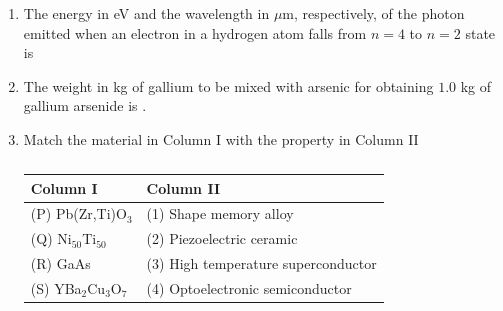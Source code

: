 \documentclass[a4paper,10pt]{article}
\begin{document}
\begin{enumerate}
    \item The energy in eV and the wavelength in $\mu$m, respectively, of the photon emitted when an electron in a hydrogen atom falls from $n = 4$ to $n = 2$ state is
    
    \hfill{}
    \begin{enumerate}
    \end{enumerate}
    
    \item The weight in kg of gallium  to be mixed with arsenic  for obtaining $1.0$ kg of gallium arsenide  is \underline{\hspace{2cm}}. 
    
    \hfill{}

    \item Match the material in Column I with the property in Column II
    \begin{table}[h!] \centering \caption*{} \label{tab:q19_material}
        \begin{tabular}{ll} \hline
            \textbf{Column I} & \textbf{Column II} \\ \hline
            (P) Pb(Zr,Ti)O$_3$ & (1) Shape memory alloy \\
            (Q) Ni$_{50}$Ti$_{50}$ & (2) Piezoelectric ceramic \\
            (R) GaAs & (3) High temperature superconductor \\
            (S) YBa$_2$Cu$_3$O$_7$ & (4) Optoelectronic semiconductor \\ \hline
        \end{tabular}
    \end{table}
    
    \hfill{}
    \begin{enumerate}
    \end{enumerate}


\end{enumerate}
\end{document}
